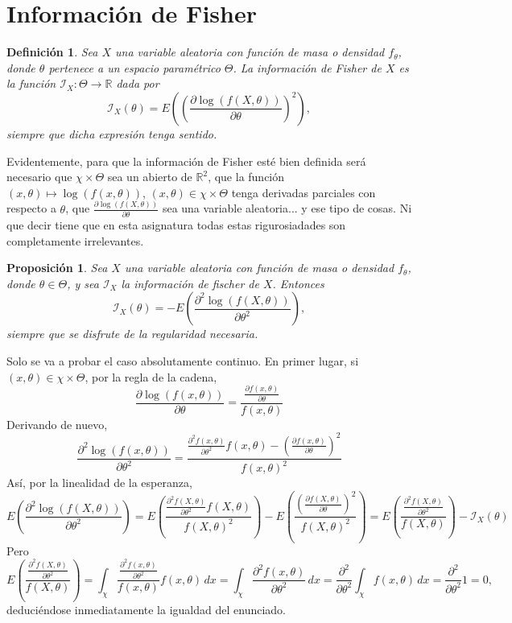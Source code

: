 \documentclass[11pt]{report}
\makeatletter
\renewenvironment{proof}[1][\proofname]{\par
  \pushQED{\qed}%
  \normalfont \topsep\z@skip %
  \trivlist
  \item[\hskip\labelsep
        \itshape
    #1\@addpunct{.}]\ignorespaces
}{%
  \popQED\endtrivlist\@endpefalse
}
\newtheorem{proposition}{Proposición}
\newtheorem{definition}{Definición}
\theoremstyle{definition}
\newcommand{\R}{\mathbb R}
\makeatother
\begin{document}
\section{Información de Fisher}

\begin{definition}
Sea $X$ una variable aleatoria con función de masa o densidad $f_\theta$, donde $\theta$ pertenece a un espacio paramétrico $\Theta$. La \emph{información de Fisher de $X$} es la función $\mathcal{I}_X \colon \Theta \to \R$ dada por
\[\mathcal{I}_{X}(\theta) = E\left(\left(\frac{\partial\log(f(X,\theta))}{\partial \theta}\right)^2\right),\]
siempre que dicha expresión tenga sentido.
\end{definition}

Evidentemente, para que la información de Fisher esté bien definida será necesario que $\chi \times \Theta$ sea un abierto de $\R^2$, que la función $(x,\theta) \mapsto \log(f(x,\theta))$, $(x,\theta) \in \chi \times \Theta$ tenga derivadas parciales con respecto a $\theta$, que $\frac{\partial \log(f(X,\theta))}{\partial \theta}$ sea una variable aleatoria... y ese tipo de cosas. Ni que decir tiene que en esta asignatura todas estas rigurosiadades son completamente irrelevantes.

\begin{proposition}
Sea $X$ una variable aleatoria con función de masa o densidad $f_\theta$, donde $\theta \in \Theta$, y sea $\mathcal{I}_X$ la información de fischer de $X$. Entonces
\[\mathcal{I}_{X}(\theta)= -E\left(\frac{\partial^2\log(f(X,\theta))}{\partial \theta^2}\right),\]
siempre que se disfrute de la regularidad necesaria.
\end{proposition}

\begin{proof}
Solo se va a probar el caso absolutamente continuo. En primer lugar, si $(x,\theta) \in \chi \times \Theta$, por la regla de la cadena,
\[\frac{\partial \log(f(x,\theta))}{\partial \theta} = \frac{\frac{\partial f(x,\theta)}{\partial\theta}}{f(x,\theta)}\]
Derivando de nuevo,
\[\frac{\partial^2\log(f(x,\theta))}{\partial\theta^2} = \frac{\frac{\partial^2f(x,\theta)}{\partial \theta^2}f(x,\theta)-\left(\frac{\partial f(x,\theta)}{\partial\theta}\right)^2}{f(x,\theta)^2}\]
Así, por la linealidad de la esperanza,
\[E\left(\frac{\partial^2\log(f(X,\theta))}{\partial\theta^2}\right) = E\left(\frac{\frac{\partial^2f(X,\theta)}{\partial \theta^2}f(X,\theta)}{f(X,\theta)^2}\right)-E\left(\frac{\left(\frac{\partial f(X,\theta)}{\partial\theta}\right)^2}{f(X,\theta)^2}\right) = E\left(\frac{\frac{\partial^2f(X,\theta)}{\partial \theta^2}}{f(X,\theta)}\right)-\mathcal{I}_X(\theta) \]
Pero
\[E\left(\frac{\frac{\partial^2f(X,\theta)}{\partial \theta^2}}{f(X,\theta)}\right) =\int_\chi\frac{\frac{\partial^2f(x,\theta)}{\partial \theta^2}}{f(x,\theta)} f(x,\theta)\, dx = \int_\chi\frac{\partial^2f(x,\theta)}{\partial \theta^2}\, dx = \frac{\partial^2}{\partial\theta^2}\int_\chi f(x,\theta)\, dx = \frac{\partial^2}{\partial\theta^2}1  = 0,\]
deduciéndose inmediatamente la igualdad del enunciado.
\end{proof}
\end{document}
